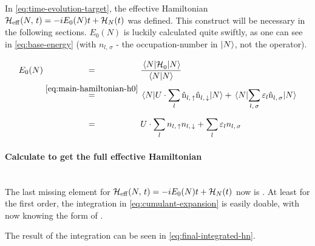 In \autoref{eq:time-evolution-target}, the effective Hamiltonian ${\mathcal{H}_\text{eff}}^{}({N},\,t) = -i E_0(N) t + \mathcal{H}_{N}(t)$ was defined.
This construct will be necessary in the following sections. 
$E_0(N)$ is luckily calculated quite swiftly, as one can see in \autoref{eq:base-energy} (with $n_{l,\,\sigma}$ - the occupation-number in $\ket{N}$, not the operator).

\begin{equation}
    \label{eq:base-energy}
    \begin{split}
        E_0(N) &\stackrel{\phantom{\ref{eq:main-hamiltonian-h0}}}{=} \frac{\bracketHelper{N}{\HzeroHamiltonian[]}{N}}{\braketHelper{N}{N}} \\
        &\stackrel{\ref{eq:main-hamiltonian-h0}}{=} \bracketHelper{N}{U \cdot \lsum \nop{l}{\up}\nop{l}{\down}}{N} + \bracketHelper{N}{\lsum[l,\,\sigma] \epsl \nop{l}{\sigma}}{N}\\
        &\stackrel{\phantom{\ref{eq:main-hamiltonian-h0}}}{=} U \cdot \lsum n_{l,\,\up}n_{l,\,\down} + \lsum \epsl n_{l,\,\sigma}
    \end{split}
\end{equation}

\paragraph*{Calculate \HNOft to get the full effective Hamiltonian}\makebox{}\\

The last missing element for ${\mathcal{H}_\text{eff}}^{}({N},\,t) = -i E_0(N) t + \mathcal{H}_{N}(t)$ now is \HNOft.
At least for the first order, the integration in \autoref{eq:cumulant-expansion} is easily doable, with now knowing the form of .

The result of the integration can be seen in \autoref{eq:final-integrated-hn}.

